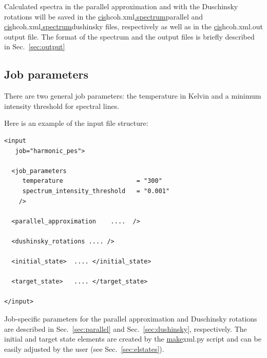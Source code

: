\documentclass[11pt]{article}
\begin{document}
Calculated spectra in the parallel approximation 
and with the Duschinsky rotations will be saved in the \ul{cis}{hcoh.xml}\ul{.spectrum}{parallel} and
\ul{cis}{hcoh.xml}\ul{.spectrum}{dushinsky} files, respectively as well as in the \ul{cis}{hcoh.xml.out} output file. 
The format of the spectrum and the output files is briefly described in Sec.~\ref{sec:output}


\subsection{Job parameters}
\label{sec:parameters}

There are two general job parameters: the temperature in Kelvin 
and a minimum intensity threshold for spectral lines.

Here is an example of the input file structure:
\begin{lstlisting}[frame=single,framerule=0pt]
<input 
   job="harmonic_pes">

  <job_parameters 
     temperature                    = "300"
     spectrum_intensity_threshold   = "0.001"
    />

  <parallel_approximation    ....  />

  <dushinsky_rotations .... />

  <initial_state>  .... </initial_state>

  <target_state>   .... </target_state>

</input>
\end{lstlisting}

Job-specific parameters for the parallel approximation and Duschinsky rotations are described
in Sec.~\ref{sec:parallel} and Sec.~\ref{sec:dushinsky}, respectively. The initial and target state elements are created 
by the \ul{make}{xml.py} script and can be easily adjusted by the user (see Sec.~\ref{sec:elstates}).
\end{document}
